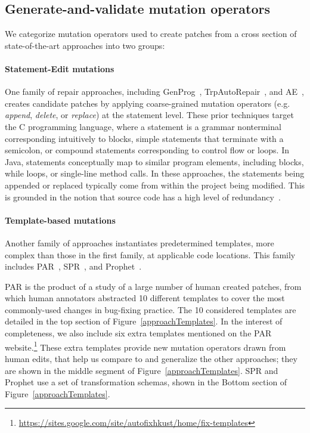 \documentclass[conference]{IEEEtran}
\begin{document}
\subsection{Generate-and-validate mutation operators} 
\label{categorization}

We categorize mutation operators used to create patches from a cross
section of state-of-the-art approaches into two groups: 

\paragraph{Statement-Edit mutations}
One family of repair approaches, including GenProg~\cite{legoues12}, 
TrpAutoRepair~\cite{Qi13TrpAutoR}, and AE~\cite{Weimer13},
creates candidate 
patches by applying coarse-grained mutation operators (e.g. \emph{append}, \emph{delete}, or 
\emph{replace}) at the statement level. These prior techniques target the C programming language, where
a statement is a grammar nonterminal corresponding intuitively to blocks,
simple statements that terminate
with a semicolon, or compound statements corresponding to control flow or
loops. In Java, statements conceptually map to similar program elements, including blocks,  while loops, or single-line
method calls. In these approaches, the statements being appended or replaced
typically come from within the project being modified. This is grounded in the
notion that source code has a high level of
redundancy~\cite{Hindle12Naturalness}. 

\paragraph{Template-based mutations}
Another family of approaches instantiates
predetermined templates, more complex than those in the first family, at applicable code locations.  This family includes PAR~\cite{kim2013}, 
SPR~\cite{long15SPR}, and 
Prophet~\cite{long16proph}.

PAR is the product of a study of a large number of 
human 
created patches, from which human annotators abstracted 10 different templates to cover
the most commonly-used changes in bug-fixing practice.
The 10 considered templates are detailed in the top section of Figure~\ref{approachTemplates}. In the interest of completeness, we also include six extra templates 
mentioned on the PAR website.\footnote{\url{https://sites.google.com/site/autofixhkust/home/fix-templates}} 
These extra templates provide new mutation operators drawn from human edits,
that help us compare to and
generalize the other approaches; they are shown in the middle segment of
Figure~\ref{approachTemplates}. 
SPR and Prophet use a set of transformation schemas,
shown in the Bottom section of Figure~\ref{approachTemplates}.
\end{document}
